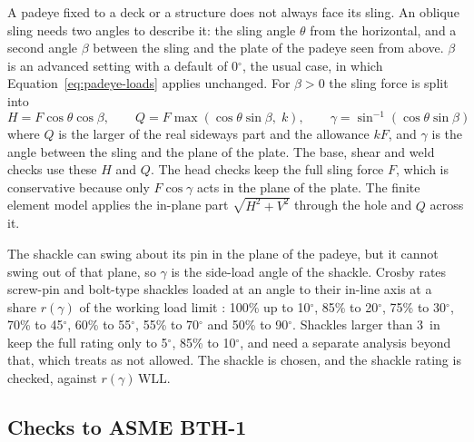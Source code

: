 A padeye fixed to a deck or a structure does not always face its sling. An
oblique sling needs two angles to describe it: the sling angle $\theta$ from
the horizontal, and a second angle $\beta$ between the sling and the plate of
the padeye seen from above. $\beta$ is an advanced setting with a default of
0$^\circ$, the usual case, in which Equation~\eqref{eq:padeye-loads} applies
unchanged. For $\beta > 0$ the sling force is split into
\begin{equation}
H = F\cos\theta\cos\beta, \qquad
Q = F\max(\cos\theta\sin\beta,\; k), \qquad
\gamma = \sin^{-1}(\cos\theta\sin\beta)
\label{eq:oblique}
\end{equation}
where $Q$ is the larger of the real sideways part and the allowance $kF$, and
$\gamma$ is the angle between the sling and the plane of the plate. The base,
shear and weld checks use these $H$ and $Q$. The head checks keep the full
sling force $F$, which is conservative because only $F\cos\gamma$ acts in the
plane of the plate. The finite element model applies the in-plane part
$\sqrt{H^2 + V^2}$ through the hole and $Q$ across it.

The shackle can swing about its pin in the plane of the padeye, but it cannot
swing out of that plane, so $\gamma$ is the side-load angle of the shackle.
Crosby rates screw-pin and bolt-type shackles loaded at an angle to their
in-line axis at a share $r(\gamma)$ of the working load limit
\cite{crosbySideLoad}: 100\% up to 10$^\circ$, 85\% to 20$^\circ$, 75\% to
30$^\circ$, 70\% to 45$^\circ$, 60\% to 55$^\circ$, 55\% to 70$^\circ$ and 50\%
to 90$^\circ$. Shackles larger than 3~in keep the full rating only to
5$^\circ$, 85\% to 10$^\circ$, and need a separate analysis beyond that, which
\NEMO{} treats as not allowed. The shackle is chosen, and the shackle rating is
checked, against $r(\gamma)\,\text{WLL}$.

\subsection{Checks to ASME BTH-1}

